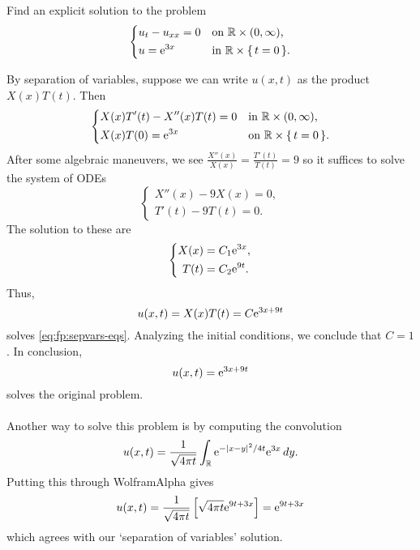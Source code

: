 \begin{problem}
  Find an explicit solution to the problem
  \[
    \left\{
      \begin{aligned}
        &u_t-u_{xx}=0&&\text{on \(\mathbb{R}\times(0,\infty)\),}\\
        &u=\mathrm{e}^{3x}&&\text{in \(\mathbb{R}\times\{\,t=0\,\}\).}
      \end{aligned}
    \right.
  \]
\end{problem}
\begin{solution*}
  By separation of variables, suppose we can write \(u(x,t)\) as the
  product \(X(x)T(t)\). Then
  \begin{equation}
    \label{eq:fp:sepvars-eqs}
    \left\{
      \begin{aligned}
        &X(x)T'(t)-X''(x)T(t)=0&&\text{in \(\mathbb{R}\times(0,\infty)\),}\\
        &X(x)T(0)=\mathrm{e}^{3x}&&\text{on \(\mathbb{R}\times\{\,t=0\,\}\).}
      \end{aligned}
    \right.
  \end{equation}
  After some algebraic maneuvers, we see
  \(\frac{X''(x)}{X(x)}=\frac{T'(t)}{T(t)}=9\) so it suffices to solve the
  system of ODEs
  \[
    \left\{
      \begin{aligned}
        X''(x)-9X(x)=0,\\
        T'(t)-9T(t)=0.
      \end{aligned}
    \right.
  \]
  The solution to these are
  \[
    \left\{%
      \begin{aligned}
        X(x)&=C_1\rme^{3x},\\
        T(t)&=C_2\rme^{9t}.
      \end{aligned}
    \right.
  \]
  Thus,
  \[
    u(x,t)=X(x)T(t)=C\mathrm{e}^{3x+9t}
  \]
  solves \eqref{eq:fp:sepvars-eqs}. Analyzing the initial conditions, we
  conclude that \(C=1\). In conclusion,
  \[
    u(x,t)=\mathrm{e}^{3x+9t}
  \]
  solves the original problem.
  \\\\
  Another way to solve this problem is by computing the convolution
  \[
    u(x,t)=%
    \frac{1}{\sqrt{4\pi t}}
    \int_\R \rme^{-|x-y|^2/4t}
    \rme^{3x}\diff y.
  \]
  Putting this through \textsf{WolframAlpha} gives
  \[
    u(x,t)=%
    \frac{1}{\sqrt{4\pi t}}%
    \left[%
      \sqrt{4\pi t}\rme^{9t+3x}%
    \right]=%
    \rme^{9t+3x}
  \]
  which agrees with our `separation of variables' solution.
\end{solution*}

